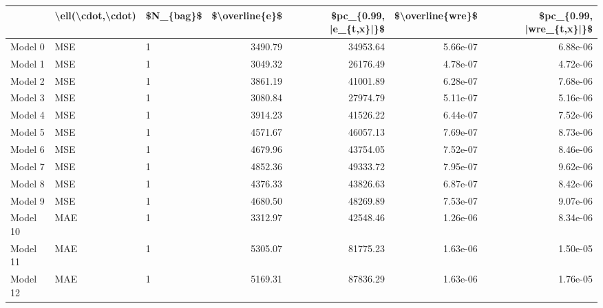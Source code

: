 \begin{tabular}{lllrrrr}
\toprule
{} & \textbackslash ell(\textbackslash cdot,\textbackslash cdot) & \$N\_\{bag\}\$ &  \$\textbackslash overline\{e\}\$ &  \$pc\_\{0.99, |e\_\{t,x\}|\}\$ &  \$\textbackslash overline\{wre\}\$ &  \$pc\_\{0.99, |wre\_\{t,x\}|\}\$ \\
\midrule
Model 0    &               MSE &         1 &         3490.79 &                34953.64 &          5.66e-07 &                  6.88e-06 \\
Model 1    &               MSE &         1 &         3049.32 &                26176.49 &          4.78e-07 &                  4.72e-06 \\
Model 2    &               MSE &         1 &         3861.19 &                41001.89 &          6.28e-07 &                  7.68e-06 \\
Model 3    &               MSE &         1 &         3080.84 &                27974.79 &          5.11e-07 &                  5.16e-06 \\
Model 4    &               MSE &         1 &         3914.23 &                41526.22 &          6.44e-07 &                  7.52e-06 \\
Model 5    &               MSE &         1 &         4571.67 &                46057.13 &          7.69e-07 &                  8.73e-06 \\
Model 6    &               MSE &         1 &         4679.96 &                43754.05 &          7.52e-07 &                  8.46e-06 \\
Model 7    &               MSE &         1 &         4852.36 &                49333.72 &          7.95e-07 &                  9.62e-06 \\
Model 8    &               MSE &         1 &         4376.33 &                43826.63 &          6.87e-07 &                  8.42e-06 \\
Model 9    &               MSE &         1 &         4680.50 &                48269.89 &          7.53e-07 &                  9.07e-06 \\
Model 10   &               MAE &         1 &         3312.97 &                42548.46 &          1.26e-06 &                  8.34e-06 \\
Model 11   &               MAE &         1 &         5305.07 &                81775.23 &          1.63e-06 &                  1.50e-05 \\
Model 12   &               MAE &         1 &         5169.31 &                87836.29 &          1.63e-06 &                  1.76e-05 \\

\end{tabular}
